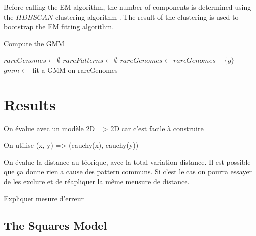 \documentclass[10pt,letterpaper]{article}
\theoremstyle{definition}
\theoremstyle{remark}
\begin{document}
Before calling the EM algorithm, the number of components is determined using the $HDBSCAN$ clustering algorithm \cite{mcinnes2017hdbscan}. 
The result of the clustering is used to bootstrap the EM fitting algorithm.


\begin{algorithm}
    \caption{Compute the GMM}
    \label{algo:computeGMM}
    \begin{algorithmic}[1]
       \State $rareGenomes \gets \emptyset$
       \State $rarePatterns \gets \emptyset$
       \Statex
         \State $rareGenomes \gets rareGenomes + \{g\}$
         \EndIf
       \EndFor
       \Statex
       \State \Return{$\emptyset$}
       \Else 
       \State $gmm \gets$ fit a GMM on rareGenomes
       \State {}
       \EndIf
    \EndFunction
    \end{algorithmic}
\end{algorithm}

\section*{Results}
\label{sec. evaluation}

On évalue avec un modèle 2D => 2D car c'est facile à construire

On utilise (x, y) => (cauchy(x), cauchy(y))


On évalue la distance au téorique, avec la total variation distance.
Il est possible que ça donne rien a cause des pattern communs.
Si c'est le cas on pourra essayer de les exclure et de réapliquer la même meusure de distance.


Expliquer mesure d'erreur


\subsection*{The Squares Model}
\end{document}
